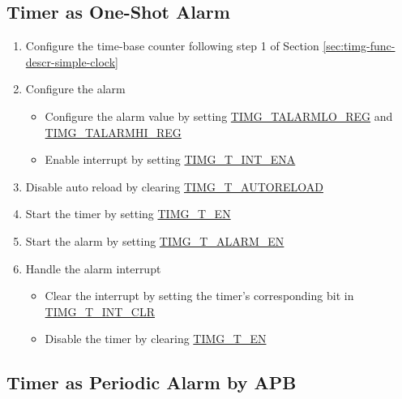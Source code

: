 \documentclass[main\_\_EN.tex]{subfiles}
\begin{document}
\subsection{Timer as One-Shot Alarm}
\label{sec:timg-func-descr-timer-alarm}

\begin{enumerate}
    \item Configure the time-base counter following step 1 of Section \ref{sec:timg-func-descr-simple-clock} \textit{}
    \item Configure the alarm
    \begin{itemize}
        \item Configure the alarm value by setting \hyperref[regdesc:TIMGTXALARMLOREG]{TIMG\_TALARMLO\_REG} and \hyperref[regdesc:TIMGTXALARMHIREG]{TIMG\_TALARMHI\_REG}
        \item Enable interrupt by setting \hyperref[fielddesc:TIMGTXINTENA]{TIMG\_T\_INT\_ENA}
    \end{itemize}
    \item Disable auto reload by clearing \hyperref[fielddesc:TIMGTXAUTORELOAD]{TIMG\_T\_AUTORELOAD}
    \item Start the timer by setting \hyperref[fielddesc:TIMGTXEN]{TIMG\_T\_EN}
    \item Start the alarm by setting \hyperref[fielddesc:TIMGTXALARMEN]{TIMG\_T\_ALARM\_EN}
    \item Handle the alarm interrupt
    \begin{itemize}
        \item Clear the interrupt by setting the timer's corresponding bit in \hyperref[fielddesc:TIMGTXINTCLR]{TIMG\_T\_INT\_CLR}
        \item Disable the timer by clearing \hyperref[fielddesc:TIMGTXEN]{TIMG\_T\_EN}
    \end{itemize}
\end{enumerate}

\subsection{Timer as Periodic Alarm by APB}
\end{document}
